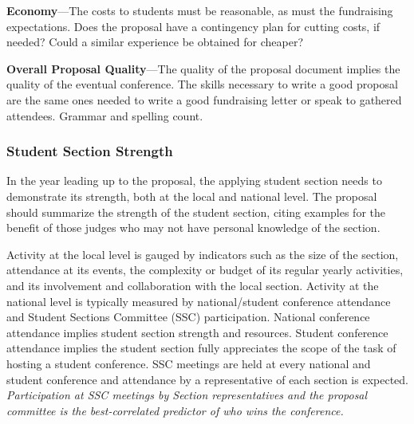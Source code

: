 \documentclass[12pt]{article}
\begin{document}
\textbf{Economy}---The costs to students must be reasonable, as must the fundraising expectations. Does the proposal have a contingency plan for cutting costs, if needed? Could a similar experience be obtained for cheaper?

\textbf{Overall Proposal Quality}---The quality of the proposal document implies the quality of the eventual conference. The skills necessary to write a good proposal are the same ones needed to write a good fundraising letter or speak to gathered attendees. Grammar and spelling count.

\subsubsection{Student Section Strength}
In the year leading up to the proposal, the applying student section needs to demonstrate its strength, both at the local and national level. The proposal should summarize the strength of the student section, citing examples for the benefit of those judges who may not have personal knowledge of the section.

Activity at the local level is gauged by indicators such as the size of the section, attendance at its events, the complexity or budget of its regular yearly activities, and its involvement and collaboration with the local section.
Activity at the national level is typically measured by national/student conference attendance and Student Sections Committee (SSC) participation. National conference attendance implies student section strength and resources.
Student conference attendance implies the student section fully appreciates the scope of the task of hosting a student conference.
SSC meetings are held at every national and student conference and attendance by a representative of each section is expected.
\textit{Participation at SSC meetings by Section representatives and the
proposal committee is the best-correlated predictor of who wins the conference.}
\end{document}
